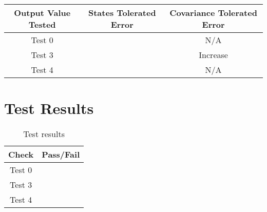 \begin{table}[ht]
\centering
\begin{tabular}{c|cc}
\hline
\hline
\textbf{Output Value Tested}     & \textbf{States Tolerated Error} & \textbf{Covariance Tolerated Error} \\ \hline
Test 0	        &         		 &  N/A                   \\
Test 3	     &      			 &  Increase                    \\
Test 4	 &      			 &  N/A            		     \\\hline
\end{tabular}
\end{table}

\section{Test Results}

\begin{table}[H]
	\caption{Test results}
	\label{tab:results}
	\centering \fontsize{10}{10}\selectfont
	\begin{tabular}{c | c}
		\hline\hline
		\textbf{Check} 			&\textbf{Pass/Fail} \\ 
		\hline
	   Test 0	   			&  \\ 
	   Test 3	   			&  \\ 
	   Test 4	   			&  \\ 
	   \hline\hline
	\end{tabular}
\end{table}
